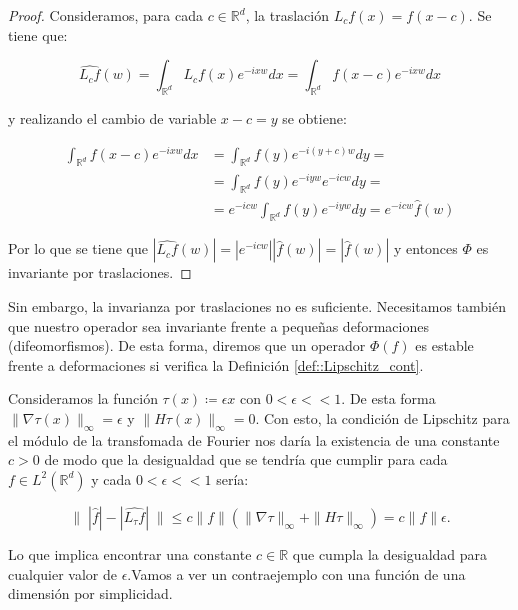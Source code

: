 \begin{proof}
    \noindent Consideramos, para cada $c \in \mathbb{R}^d$, la traslación $L_cf(x)=f(x-c)$. Se tiene que:  
    
    $$\widehat{L_cf}(w)=\int_{\mathbb{R}^d}{L_cf(x) e^{-ixw} dx}=\int_{\mathbb{R}^d}{f(x-c)e^{-ixw}dx}$$
    
    \noindent y realizando el cambio de variable $x-c=y$ se obtiene: 
    
    \begin{align*}
        \int_{\mathbb{R}^d}{f(x-c)e^{-ixw}dx} &= \int_{\mathbb{R}^d}{f(y)e^{-i(y+c)w}dy}= \\      &=\int_{\mathbb{R}^d}{f(y)e^{-iyw}e^{-icw}dy}= \\ &=e^{-icw}\int_{\mathbb{R}^d}{f(y)e^{-iyw}dy}=e^{-icw}\widehat{f}(w)
    \end{align*}
    
    \noindent Por lo que se tiene que $|\widehat{L_cf}(w)|=|e^{-icw}| |\widehat{f}(w)|=|\widehat{f}(w)|$ y entonces $\Phi$ es invariante por traslaciones. \qedhere
\end{proof}

\medskip
    
\noindent Sin embargo, la invarianza por traslaciones no es suficiente. Necesitamos también que nuestro operador sea invariante frente a pequeñas deformaciones (difeomorfismos). De esta forma, diremos que un operador $\Phi(f)$ es estable frente a deformaciones si verifica la Definición \ref{def::Lipschitz_cont}.

\noindent Consideramos la función $\tau(x)\coloneqq \epsilon x$ con $0 < \epsilon << 1$. De esta forma $\|\nabla \tau (x) \|_\infty = \epsilon$ y $\|H\tau(x)\|_\infty=0$. Con esto, la condición de Lipschitz para el módulo de la transfomada de Fourier nos daría la existencia de una constante $c>0$ de modo que la desigualdad que se tendría que cumplir para cada $f \in L^2(\mathbb{R}^d)$ y cada $0 < \epsilon << 1$ sería:


  \begin{equation} \label{eq::lipschitz_condition}
    \|\;|\widehat{f}| -|\widehat{L_\tau f}| \; \| \leq c \|f\| (\|\nabla \tau \|_{\infty} + \|H\tau\|_\infty) = c \|f\| \epsilon.
  \end{equation}

  \noindent Lo que implica encontrar una constante $c\in \mathbb{R}$ que cumpla la desigualdad para cualquier valor de $\epsilon$.Vamos a ver un contraejemplo con una función de una dimensión por simplicidad.

